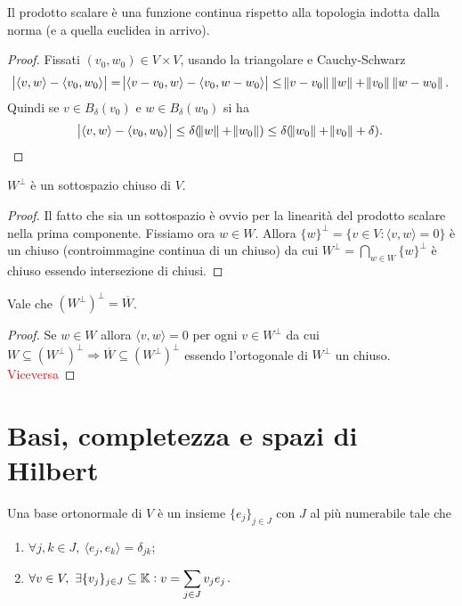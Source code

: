 \begin{lemma}
    Il prodotto scalare è una funzione continua rispetto alla topologia indotta dalla norma (e a quella euclidea in arrivo).
\end{lemma}
\begin{proof}
    Fissati $ (v_0, w_0) \in V \times V $, usando la triangolare e Cauchy-Schwarz
    \[
        \abs{{\langle v, w \rangle} - {\langle v_0, w_0 \rangle}} = \abs{{\langle v - v_0, w\rangle} - {\langle v_0, w - w_0 \rangle}} \leq \norm{v - v_0} \, \norm{w} + \norm{v_0} \, \norm{w - w_0}.
    \]
    Quindi se $ v \in B_\delta(v_0) $ e $ w \in B_\delta(w_0) $ si ha
    \[
        \abs{{\langle v, w \rangle} - {\langle v_0, w_0 \rangle}} \leq \delta(\norm{w} + \norm{w_0}) \leq \delta(\norm{w_0} + \norm{v_0} + \delta). \qedhere
    \]
\end{proof}

\begin{proposition}
    $ W^\perp $ è un sottospazio chiuso di $ V $.
\end{proposition}
\begin{proof}
    Il fatto che sia un sottospazio è ovvio per la linearità del prodotto scalare nella prima componente. Fissiamo ora $ w \in W $. Allora $ \{w\}^\perp = \{v \in V : {\langle v, w \rangle} = 0\} $ è un chiuso (controimmagine continua di un chiuso) da cui $ W^\perp = \bigcap_{w \in W} \{w\}^\perp $ è chiuso essendo intersezione di chiusi. 
\end{proof}

\begin{proposition}
    Vale che $ (W^\perp)^\perp = \overline{W} $.
\end{proposition}
\begin{proof}
    Se $ w \in W $ allora $ {\langle v, w \rangle} = 0 $ per ogni $ v \in W^\perp $ da cui $ W \subseteq (W^\perp)^\perp \Rightarrow \overline{W} \subseteq (W^\perp)^\perp $ essendo l'ortogonale di $ W^\perp $ un chiuso. \textcolor{red}{Viceversa}
\end{proof}

\section{Basi, completezza e spazi di Hilbert}

\begin{definition}
    Una base ortonormale di $ V $ è un insieme $ \{e_j\}_{j \in J} $ con $ J $ al più numerabile tale che
    \begin{enumerate}[label=(\roman*)]
        \item $ \forall j, k \in J, \ {\langle e_j, e_k \rangle} = \delta_{jk} $;
        \item\label{def:coin:base} $ \forall v \in V, \ \exists \{v_j\}_{j \in J} \subseteq \mathbb{K} : v = \displaystyle{\sum_{j \in J} v_j e_j} $. 
    \end{enumerate}
\end{definition} 

